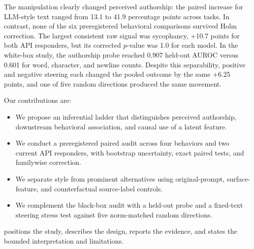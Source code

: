 The manipulation clearly changed perceived authorship: the paired increase for LLM-style text ranged from 13.1 to 41.9 percentage points across tasks. In contrast, none of the six preregistered behavioral comparisons survived Holm correction. The largest consistent raw signal was sycophancy, +10.7 points for both API responders, but its corrected $p$-value was 1.0 for each model. In the white-box study, the authorship probe reached 0.907 held-out AUROC versus 0.601 for word, character, and newline counts. Despite this separability, positive and negative steering each changed the pooled outcome by the same +6.25 points, and one of five random directions produced the same movement.

Our contributions are:
\begin{itemize}[leftmargin=*,itemsep=0pt,topsep=0pt]
    \item We propose an inferential ladder that distinguishes perceived authorship, downstream behavioral association, and causal use of a latent feature.
    \item We conduct a preregistered paired audit across four behaviors and two current API responders, with bootstrap uncertainty, exact paired tests, and familywise correction.
    \item We separate style from prominent alternatives using original-prompt, surface-feature, and counterfactual source-label controls.
    \item We complement the black-box audit with a held-out probe and a fixed-text steering stress test against five norm-matched random directions.
\end{itemize}

 positions the study,  describes the design,  reports the evidence, and  states the bounded interpretation and limitations.

